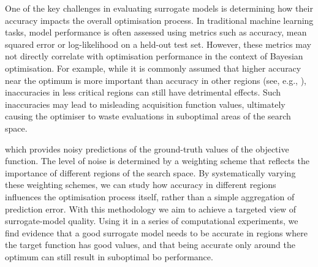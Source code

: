 One of the key challenges in evaluating surrogate models is determining how their accuracy impacts the overall optimisation process. In traditional machine learning tasks, model performance is often assessed using metrics such as accuracy, mean squared error or log-likelihood on a held-out test set. However, these metrics may not directly correlate with optimisation performance in the context of Bayesian optimisation. For example, while it is commonly assumed that higher accuracy near the optimum is more important than accuracy in other regions (see, e.g., \citealp{Frazier2018}), 
inaccuracies in less critical regions can still have detrimental effects. Such inaccuracies may lead to misleading acquisition function values, ultimately causing the optimiser to waste evaluations in suboptimal areas of the search space.  

which provides noisy predictions of the ground-truth values of the objective function. The level of noise is determined by a weighting scheme that reflects the importance of different regions of the search space. By systematically varying these weighting schemes, we can study how accuracy in different regions influences the optimisation process itself, rather than a simple aggregation of prediction error. With this methodology we aim to achieve a targeted view of surrogate-model quality.
Using it in a series of computational experiments, we find evidence that a good surrogate model needs to be accurate in regions where the target function has good values, and that being accurate only around the optimum can still result in suboptimal \gls{bo} performance.

